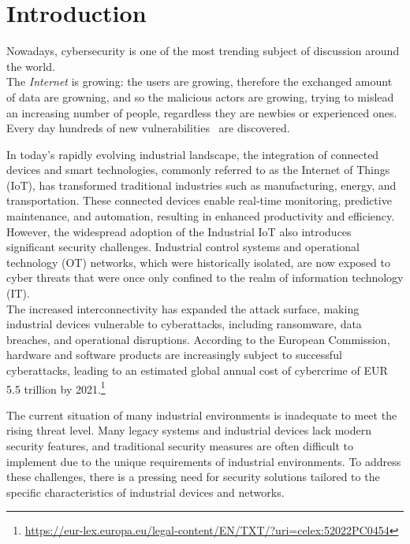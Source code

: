 \chapter{Introduction}
\label{cha:intro}

Nowadays, cybersecurity is one of the most trending subject of discussion around the world.\\

The \textit{Internet} is growing: the users are growing, therefore the exchanged amount of data are growning, and so the malicious actors are growing, trying to mislead an increasing number of people, regardless they are newbies or experienced ones. Every day hundreds of new vulnerabilities~\cite{cve-details-db} are discovered.

In today's rapidly evolving industrial landscape, the integration of connected devices and smart technologies, commonly referred to as the Internet of Things (IoT), has transformed traditional industries such as manufacturing, energy, and transportation. These connected devices enable real-time monitoring, predictive maintenance, and automation, resulting in enhanced productivity and efficiency. \\
However, the widespread adoption of the Industrial IoT also introduces significant security challenges. Industrial control systems and operational technology (OT) networks, which were historically isolated, are now exposed to cyber threats that were once only confined to the realm of information technology (IT). \\
The increased interconnectivity has expanded the attack surface, making industrial devices vulnerable to cyberattacks, including ransomware, data breaches, and operational disruptions. According to the European Commission, hardware and software products are increasingly subject to successful cyberattacks, leading to an estimated global annual cost of cybercrime of EUR 5.5 trillion by 2021.\footnote{\url{https://eur-lex.europa.eu/legal-content/EN/TXT/?uri=celex:52022PC0454}}

The current situation of many industrial environments is inadequate to meet the rising threat level. Many legacy systems and industrial devices lack modern security features, and traditional security measures are often difficult to implement due to the unique requirements of industrial environments. To address these challenges, there is a pressing need for security solutions tailored to the specific characteristics of industrial devices and networks.

